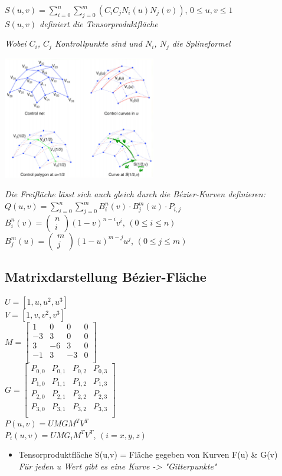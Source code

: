 $S(u,v) = \displaystyle \sum^n_{i=0}\sum^m_{j=0}(C_iC_jN_i(u)N_j(v))$, $0 \leq u, v \leq 1$\\
\textit{$S(u,v)$ definiert die Tensorproduktfläche}

\textit{Wobei $C_i$, $C_j$ Kontrollpunkte sind und $N_i$, $N_j$ die Splineformel}

\includegraphics[width=0.5\textwidth]{assets/area-splines.png}

\textit{Die Freifläche lässt sich auch gleich durch die Bézier-Kurven definieren:}\\

$Q(u,v)= \displaystyle \sum^n_{i=0}\sum^m_{j=0}B^n_i(v) \cdot B_j^m(u) \cdot P_{i,j}$\\
$B_i^n(v) = \left(\begin{matrix}
    n \\ i
\end{matrix}\right) (1 - v)^{n-i}v^i$, $(0 \leq i \leq n)$\\
$B_j^m(u) = \left(\begin{matrix}
    m \\ j
\end{matrix}\right) (1 - u)^{m-j}u^j$, $(0 \leq j \leq m)$

\subsection{Matrixdarstellung Bézier-Fläche}

$U=[1,u,u^2,u^3]$\\
$V=[1,v,v^2,v^3]$\\
$M=\begin{bmatrix}
    1 & 0 & 0 & 0 \\
   -3 & 3 & 0 & 0 \\
    3 &-6 & 3 & 0 \\
   -1 & 3 &-3 & 0 \\
\end{bmatrix}$\\
$G = \begin{bmatrix}
    P_{0,0} & P_{0,1} & P_{0,2} & P_{0,3} \\
    P_{1,0} & P_{1,1} & P_{1,2} & P_{1,3} \\
    P_{2,0} & P_{2,1} & P_{2,2} & P_{2,3} \\
    P_{3,0} & P_{3,1} & P_{3,2} & P_{3,3} \\
\end{bmatrix}$\\

$P(u,v) = UMGM^TV^T$\\
$P_i(u,v) = UMG_iM^TV^T$, $(i = x,y,z)$

\begin{itemize}
    \item Tensorproduktfläche S(u,v) = Fläche gegeben von Kurven F(u) \& G(v) \\
    \textit{Für jeden u Wert gibt es eine Kurve -> "Gitterpunkte"}
\end{itemize}